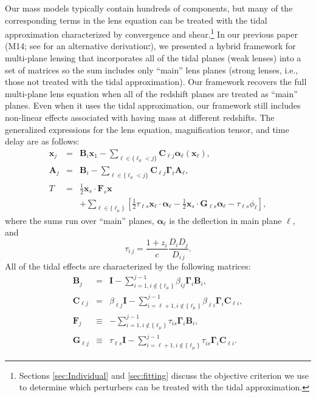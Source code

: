 \documentclass{emulateapj}
\newcommand\A[0]{\mathbf{A}}
\newcommand\B[0]{\mathbf{B}}
\newcommand\C[0]{\mathbf{C}}
\newcommand\I[0]{\mathbf{I}}
\newcommand\F[0]{\mathbf{F}}
\newcommand\G[0]{\mathbf{G}}
\newcommand\GammaMat[0]{\boldsymbol{\Gamma}}
\newcommand\x[0]{\mathbf{x}}
\newcommand\al[0]{\boldsymbol{\alpha}}
\providecommand{\DIFdeltex}[1]{{\protect\color{red}\sout{#1}}}                      %
\providecommand{\DIFdelbegin}{} %
\providecommand{\DIFdelend}{} %
\providecommand{\DIFdel}[1]{\texorpdfstring{\DIFdeltex{#1}}{}} %
\begin{document}
Our mass models typically contain hundreds of components, but many of the corresponding terms in the lens equation can be treated with the tidal approximation characterized by convergence and shear.\footnote{Sections \ref{sec:Individual} and \ref{sec:fitting} discuss the objective criterion we use to determine which perturbers can be treated with the tidal approximation.}  In our previous paper (M14; see \citealt{Schneider14} for an alternative derivation\DIFdelbegin \DIFdel{.}\DIFdelend ), we presented a hybrid framework for multi-plane lensing that incorporates all of the tidal planes (weak lenses) into a set of matrices so the sum includes only ``main'' lens planes (strong lenses, i.e., those not treated with the tidal approximation). Our framework recovers the full multi-plane lens equation when all of the redshift planes are treated as ``main'' planes. Even when it uses the tidal approximation, our framework still includes non-linear effects associated with having mass at different redshifts.  The generalized expressions for the lens equation, magnification tensor, and time delay are as follows:
\begin{eqnarray}
\x_{j} &=& \B_i \x_1 - \sum_{\ell \in \{\ell_\mu<j\}} \C_{\ell j} \al_\ell(\x_\ell),\label{eqn:lenseqn}\\
\A_{j} &=& \B_i - \sum_{\ell \in \{\ell_\mu<j\}} \C_{\ell j} \GammaMat_\ell \A_\ell,\\
T &=& \frac{1}{2} \x_s \cdot \F_s \x \nonumber \\
&&+ \sum\limits_{\ell \in \{\ell_\mu\}}\left[\frac{1}{2}\tau_{\ell s} \x_\ell \cdot \al_\ell -\frac{1}{2}\x_s \cdot \G_{\ell s}\al_\ell -\tau_{\ell s}\phi_\ell \right],
\end{eqnarray}
where the sums run over ``main'' planes, $\al_\ell$ is the deflection in main plane $\ell$, and  
\begin{equation}
\tau_{i\,j} = \frac{ 1 + z_i}{c} \frac{D_i D_j}{D_{i\,j}}.
\end{equation}
All of the tidal effects are characterized by the following matrices:
\begin{eqnarray}
\B_j &=& \I - \sum\limits_{i=1,i\not \in \{\ell_\mu\}}^{j-1}\beta_{ij}\GammaMat_i \B_i, \\
\C_{\ell j} &=& \beta_{\ell j} \I - \sum\limits_{i=\ell+1, i\not\in\{\ell_\mu\}}^{j-1} \beta_{\ell i}\GammaMat_i\C_{\ell i}, \label{eqn:cmatdef}\\
\F_j &\equiv& 
  - \sum\limits_{i=1,i\not \in \{\ell_\mu\}}^{j-1} \tau_{is}\GammaMat_i\B_i, \\
\G_{\ell j}&\equiv& 
 \tau_{\ell s}\I- \sum\limits_{i=\ell+1,i \not \in \{\ell_\mu\}}^{j-1} \tau_{is}\GammaMat_i\C_{\ell i}.
\end{eqnarray}
\end{document}
